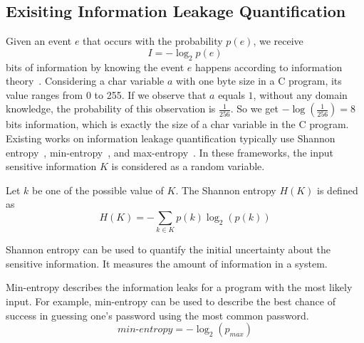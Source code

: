 
\subsection{Exisiting Information Leakage Quantification}\label{sec:background_leak}

Given an event $e$ that occurs with the probability $p(e)$, we receive
\begin{displaymath}
    I = - \log_2p(e)
\end{displaymath}
bits of information by knowing the event $e$ happens according to information theory~\cite{shannon1948mathematical}. 
Considering a char variable $a$
with one byte size in a C program, its value ranges from 0 to 255.
If we observe that $a$ equals $1$, without any domain knowledge, 
the probability of this observation is $\frac{1}{256}$. 
So we get $-\log(\frac{1}{256}) = 8$ bits information, which is exactly the size
of a char variable in the C program.
Existing works on information leakage quantification typically use Shannon
entropy~\cite{clark2007static,Wichelmann:2018:MFF:3274694.3274741},
min-entropy~\cite{10.1007/978-3-642-00596-1_21}, and max-entropy~\cite{182946,
Doychev:2017:RAS:3062341.3062388}. In these frameworks, the input sensitive
information $K$ is considered as a random variable.

Let $k$ be one of the possible
value of $K$. The Shannon entropy $H(K)$ is defined as
\begin{displaymath}
    H(K) = - \sum_{k {\in} K}p(k)\log_2(p(k))
\end{displaymath}

Shannon entropy can be used to quantify the initial uncertainty about the
sensitive information. It measures the amount of information in a system.

Min-entropy describes the information leaks for a program with the most likely input. 
For example, min-entropy can be used to describe the
best chance of success in guessing one's password using the
most common password. %
\begin{displaymath}
    \mathit{min\text{-}entropy} = - \log_2(p_{\mathit{max}})
\end{displaymath}

